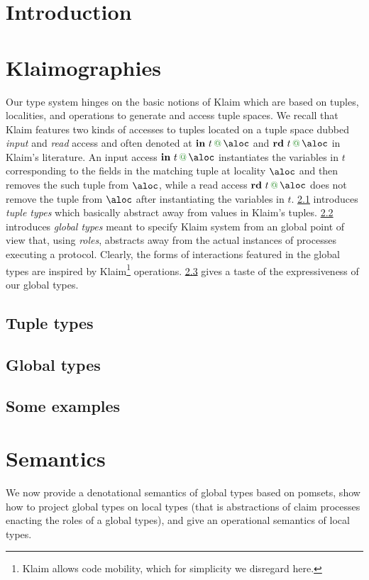\documentclass[runningheads,a4paper]{llncs}
\begin{document}
\section{Introduction}
\label{sec:intro}


\section{Klaimographies}
\label{sec:klaimographies}
Our type system hinges on the basic notions of Klaim which are based
on tuples, localities, and operations to generate and access tuple
spaces.
%
We recall that Klaim features two kinds of accesses to tuples located
on a tuple space dubbed \emph{input} and \emph{read} access and often
denoted at $\textbf{in}\ t \at \aloc$ and
$\textbf{rd}\ t \at \aloc$ in Klaim's literature.
%
An input access $\textbf{in}\ t \at \aloc$ instantiates the
variables in $t$ corresponding to the fields in the matching
tuple at locality $\aloc$ and then removes the such tuple from $\aloc$, while
a read access $\textbf{rd}\ t \at \aloc$ does not remove the
tuple from $\aloc$ after instantiating the variables in $t$.
%
\cref{sec:tuples} introduces \emph{tuple types} which basically
abstract away from values in Klaim's tuples.
%
\cref{sec:gt} introduces \emph{global types} meant to specify
Klaim system from an global point of view that, using \emph{roles},
abstracts away from the actual instances of processes executing a
protocol.
%
Clearly, the forms of interactions featured in the global types are
inspired by Klaim\footnote{Klaim allows code mobility, which for
  simplicity we disregard here.} operations.
%
\cref{sec:examples} gives a taste of the expressiveness of our global
types.
\subsection{Tuple types}
\label{sec:tuples}

\subsection{Global types}
\label{sec:gt}

\subsection{Some examples}
\label{sec:examples}

%

\section{Semantics}
We now provide a denotational semantics of global types based on
pomsets, show how to project global types on local types (that is
abstractions of claim processes enacting the roles of a global types),
and give an operational semantics of local types.
\end{document}
